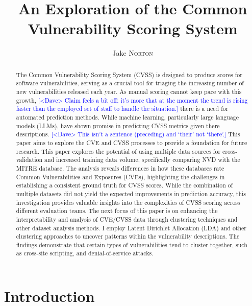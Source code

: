 \documentclass[12pt]{article}
\title{An Exploration of the Common Vulnerability Scoring System}
\author{Jake \textsc{Norton}}
\newcommand{\note}[2][red]{\textcolor{#1}{#2}}
\newcommand{\notedme}[1]{\note[blue]{[<Dave> #1]}}
\begin{document}
\maketitle

\begin{abstract}

	The Common Vulnerability Scoring System (CVSS) is designed to produce scores for software
	vulnerabilities, serving as a crucial tool for triaging the increasing number of new
	vulnerabilities released each year. As manual scoring cannot keep pace with this growth,
	\notedme{Claim feels a bit off: it's more that at the moment the trend is rising faster than the employed set of staff to handle the situation.}
	there
	is a need for automated prediction methods. While machine learning, particularly large language
	models (LLMs), have shown promise in predicting CVSS metrics given there descriptions.
	\notedme{This isn't a sentence (preceding) and `their' not `there'.}
	This
	paper aims to explore the CVE and CVSS processes to provide a foundation for future research.
	This paper explores the potential of using multiple data sources for cross-validation and
	increased training data volume, specifically comparing NVD with the MITRE database. The analysis
	reveals differences in how these databases rate Common Vulnerabilities and Exposures (CVEs),
	highlighting the challenges in establishing a consistent ground truth for CVSS scores. While the
	combination of multiple datasets did not yield the expected improvements in prediction accuracy,
	this investigation provides valuable insights into the complexities of CVSS scoring across
	different evaluation teams. The next focus of this paper is on enhancing the interpretability
	and analysis of CVE/CVSS data through clustering techniques and other dataset analysis methods.
	I employ Latent Dirichlet Allocation (LDA) and other clustering approaches to uncover patterns
	within the vulnerability descriptions. The findings demonstrate that certain types of vulnerabilities
	tend to cluster together, such as cross-site scripting, and denial-of-service attacks.
\end{abstract}


\section{Introduction}
\end{document}
